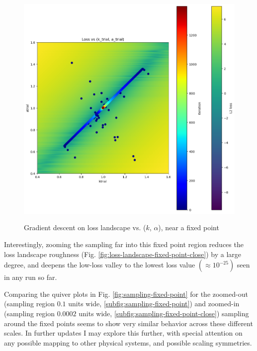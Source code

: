 \documentclass[]{article}
\begin{document}
\begin{figure}[H]
	\caption{Gradient descent on loss landscape vs. ($k$, $\alpha$), near a fixed point}
	\centering
	\includegraphics[scale=0.60]{gradient-descent-paths-fixed-point.png}
	\label{fig:gradient-descent-paths-fixed-point}
\end{figure}

Interestingly, zooming the sampling far into this fixed point region reduces the loss landscape roughness (Fig. \ref{fig:loss-landscape-fixed-point-close}) by a large degree, and deepens the low-loss valley to the lowest loss value $(\approx10^{-25})$ seen in any run so far.

Comparing the quiver plots  in Fig. \ref{fig:sampling-fixed-point} for the zoomed-out (sampling region $0.1$ units wide, \ref{subfig:sampling-fixed-point}) and zoomed-in (sampling region $0.0002$ units wide, \ref{subfig:sampling-fixed-point-close}) sampling around the fixed points seems to show very similar behavior across these different scales. In further updates I may explore this further, with special attention on any possible mapping to other physical systems, and possible scaling symmetries.
\end{document}
